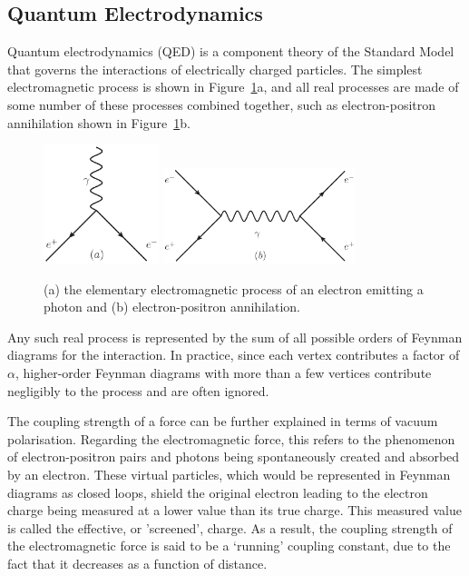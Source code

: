 \subsection{Quantum Electrodynamics}
\label{ss:quantum_electrodynamics}

Quantum electrodynamics (QED) is a component theory of the Standard Model that governs the interactions of
electrically charged particles. The simplest electromagnetic process is shown in
Figure~\ref{fig:qed_processes}a, and all real processes are made of some number of these processes combined
together, such as electron-positron annihilation shown in Figure~\ref{fig:qed_processes}b.

\begin{figure}[hbtp]
   \centering
     \includegraphics[width=0.3\textwidth]{Chapters/03_Theory/Images/e_e_gamma}\hfill
     \includegraphics[width=0.5\textwidth]{Chapters/03_Theory/Images/e_e_gamma_e_e}
     \caption[Elementary electromagnetic processes.]{(a) the elementary electromagnetic process of an electron
     emitting a photon and (b) electron-positron annihilation.}
     \label{fig:qed_processes}
\end{figure}

Any such real process is represented by the sum of all possible orders of Feynman diagrams for the
interaction. In practice, since each vertex contributes a factor of $\alpha$, higher-order Feynman diagrams
with more than a few vertices contribute negligibly to the process and are often ignored.

The coupling strength of a force can be further explained in terms of vacuum polarisation. Regarding the
electromagnetic force, this refers to the phenomenon of electron-positron pairs and photons being
spontaneously created and absorbed by an electron. These virtual particles, which would be represented in
Feynman diagrams as closed loops, shield the original electron leading to the electron charge being measured
at a lower value than its true charge. This measured value is called the effective, or 'screened', charge. As
a result, the coupling strength of the electromagnetic force is said to be a `running' coupling
constant, due to the fact that it decreases as a function of distance.

